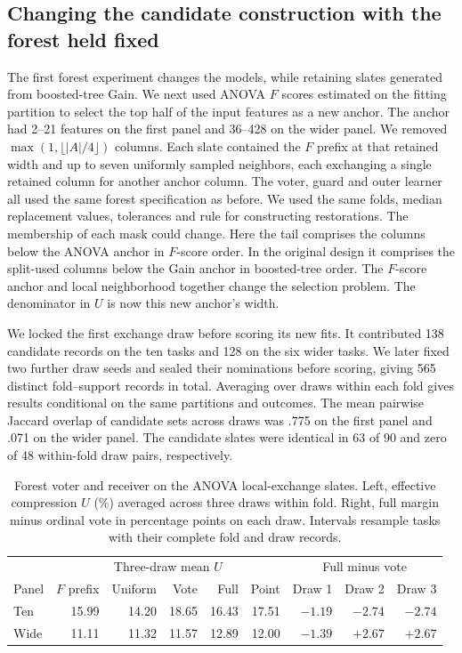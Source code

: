 \subsection{Changing the candidate construction with the forest held fixed}
The first forest experiment changes the models, while retaining slates generated from boosted-tree Gain. We next used ANOVA $F$ scores estimated on the fitting partition to select the top half of the input features as a new anchor. The anchor had 2--21 features on the first panel and 36--428 on the wider panel. We removed $\max(1,\lfloor |A|/4\rfloor)$ columns. Each slate contained the $F$ prefix at that retained width and up to seven uniformly sampled neighbors, each exchanging a single retained column for another anchor column. The voter, guard and outer learner all used the same forest specification as before. We used the same folds, median replacement values, tolerances and rule for constructing restorations. The membership of each mask could change. Here the tail comprises the columns below the ANOVA anchor in $F$-score order. In the original design it comprises the split-used columns below the Gain anchor in boosted-tree order. The $F$-score anchor and local neighborhood together change the selection problem. The denominator in $U$ is now this new anchor's width.

We locked the first exchange draw before scoring its new fits. It contributed 138 candidate records on the ten tasks and 128 on the six wider tasks. We later fixed two further draw seeds and sealed their nominations before scoring, giving 565 distinct fold--support records in total. Averaging over draws within each fold gives results conditional on the same partitions and outcomes. The mean pairwise Jaccard overlap of candidate sets across draws was .775 on the first panel and .071 on the wider panel. The candidate slates were identical in 63 of 90 and zero of 48 within-fold draw pairs, respectively.

\begin{table}[tb]
\centering\small
\caption{Forest voter and receiver on the ANOVA local-exchange slates. Left, effective compression $U$ (\%) averaged across three draws within fold. Right, full margin minus ordinal vote in percentage points on each draw. Intervals resample tasks with their complete fold and draw records.}
\label{tab:neighborhood}
\begin{tabular}{@{}lrrrrrrrr@{}}
\toprule
 & \multicolumn{5}{c}{Three-draw mean $U$} & \multicolumn{3}{c}{Full minus vote}\\
Panel & $F$ prefix & Uniform & Vote & Full & Point & Draw 1 & Draw 2 & Draw 3\\
\midrule
Ten & 15.99 & 14.20 & 18.65 & 16.43 & 17.51 & $-1.19$ & $-2.74$ & $-2.74$\\
Wide & 11.11 & 11.32 & 11.57 & 12.89 & 12.00 & $-1.39$ & $+2.67$ & $+2.67$\\
\bottomrule
\end{tabular}
\end{table}

